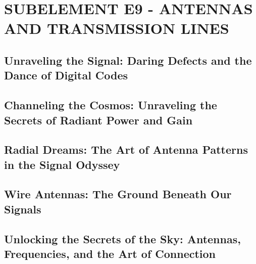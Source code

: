 \documentclass[12pt]{book}
\begin{document}
\chapter{SUBELEMENT E9 - ANTENNAS AND TRANSMISSION LINES}
\section{Unraveling the Signal: Daring Defects and the Dance of Digital Codes}
\section{Channeling the Cosmos: Unraveling the Secrets of Radiant Power and Gain}












\section{Radial Dreams: The Art of Antenna Patterns in the Signal Odyssey}











\section{Wire Antennas: The Ground Beneath Our Signals}














\section{Unlocking the Secrets of the Sky: Antennas, Frequencies, and the Art of Connection}












\end{document}

